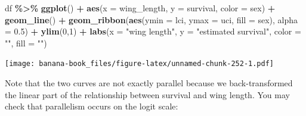 \documentclass[
  12pt,
]{krantz}
\newenvironment{Shaded}{\begin{snugshade}}{\end{snugshade}}
\newcommand{\AttributeTok}[1]{\textcolor[rgb]{0.13,0.29,0.53}{#1}}
\newcommand{\DecValTok}[1]{\textcolor[rgb]{0.00,0.00,0.81}{#1}}
\newcommand{\FloatTok}[1]{\textcolor[rgb]{0.00,0.00,0.81}{#1}}
\newcommand{\FunctionTok}[1]{\textcolor[rgb]{0.13,0.29,0.53}{\textbf{#1}}}
\newcommand{\NormalTok}[1]{#1}
\newcommand{\SpecialCharTok}[1]{\textcolor[rgb]{0.81,0.36,0.00}{\textbf{#1}}}
\newcommand{\StringTok}[1]{\textcolor[rgb]{0.31,0.60,0.02}{#1}}
\begin{document}
\begin{Shaded}
\begin{Highlighting}[]
\NormalTok{df }\SpecialCharTok{\%\textgreater{}\%}
  \FunctionTok{ggplot}\NormalTok{() }\SpecialCharTok{+} 
  \FunctionTok{aes}\NormalTok{(}\AttributeTok{x =}\NormalTok{ wing\_length, }\AttributeTok{y =}\NormalTok{ survival, }\AttributeTok{color =}\NormalTok{ sex) }\SpecialCharTok{+} 
  \FunctionTok{geom\_line}\NormalTok{() }\SpecialCharTok{+} 
  \FunctionTok{geom\_ribbon}\NormalTok{(}\FunctionTok{aes}\NormalTok{(}\AttributeTok{ymin =}\NormalTok{ lci, }\AttributeTok{ymax =}\NormalTok{ uci, }\AttributeTok{fill =}\NormalTok{ sex), }\AttributeTok{alpha =} \FloatTok{0.5}\NormalTok{) }\SpecialCharTok{+} 
  \FunctionTok{ylim}\NormalTok{(}\DecValTok{0}\NormalTok{,}\DecValTok{1}\NormalTok{) }\SpecialCharTok{+} 
  \FunctionTok{labs}\NormalTok{(}\AttributeTok{x =} \StringTok{"wing length"}\NormalTok{, }\AttributeTok{y =} \StringTok{"estimated survival"}\NormalTok{, }\AttributeTok{color =} \StringTok{""}\NormalTok{, }\AttributeTok{fill =} \StringTok{""}\NormalTok{)}
\end{Highlighting}
\end{Shaded}

\texttt{[image: banana-book\_files/figure-latex/unnamed-chunk-252-1.pdf]}

Note that the two curves are not exactly parallel because we back-transformed the linear part of the relationship between survival and wing length. You may check that parallelism occurs on the logit scale:
\end{document}
